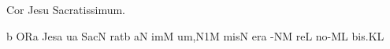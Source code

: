 
\beginhymn Cor Jesu Sacratissimum.

\Internote
\nosolesmescustos
\initiumgregorianum
\znotes\fissum{3pt}\bmolle b\en
{}%
\sgn {}OR\punctum a\egn
\spatium
\begingroup
\bgenerale
\sgn Jes\punctum a\egn
\sgn {}u{}\punctum a\egn
\spatium
\sgn Sac\punctum N\egn
\sgn rat\punctum b\egn
{}\clivis aN\egn
\sgn {}im\punctum M\egn
\sgn {}u{m,}\episem N1\punctum M\egn
\spatium
\divisiominor
\spatium
\sgn mis\punctum N\egn
\sgn {}er\punctum a\egn
{}-\clivis NM\egn
\sgn re{}\punctum L\egn
\spatium
\sgn no-\clivis ML\egn
\sgn bi{s.}\punctum K\augmentum L\egn
\spatium
\endgroup
\Finisgregoriana

\bigskip


